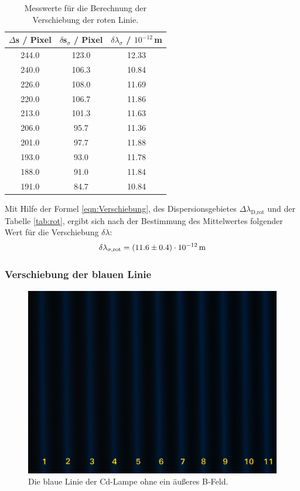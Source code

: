 \begin{table}[H]
  \centering
  \caption{Messwerte für die Berechnung der Verschiebung der roten Linie.}
  \label{tab:rot}
  \begin{tabular}{c c c}
    $\Delta$s / Pixel & $\delta$s$_{\sigma}$ / Pixel & $\delta \lambda_{\sigma}$ / $10^{-12}$\,m \\
    \hline
    244.0 & 123.0 & 12.33 \\
    240.0 & 106.3 & 10.84 \\
    226.0 & 108.0 & 11.69 \\
    220.0 & 106.7 & 11.86 \\
    213.0 & 101.3 & 11.63 \\
    206.0 & 95.7  & 11.36 \\
    201.0 & 97.7  & 11.88 \\
    193.0 & 93.0  & 11.78 \\
    188.0 & 91.0  & 11.84 \\
    191.0 & 84.7  & 10.84 \\
    \hline
  \end{tabular}
\end{table}

Mit Hilfe der Formel \eqref{eqn:Verschiebung}, des Dispersionsgebietes $\Delta\lambda_\text{D,rot}$ und der Tabelle \eqref{tab:rot}, ergibt sich nach der Bestimmung des Mittelwertes folgender Wert für die Verschiebung $\delta\lambda$:
\begin{align*}
  \delta \lambda_{\sigma,\text{rot}} = (\num{11.6 +- 0.4})\cdot 10^{-12}\,\text{m} \\
\end{align*}



\subsubsection{Verschiebung der blauen Linie}
\begin{figure}[H]
  \centering
  \includegraphics[width=0.8\linewidth]{Bilder/BoB.JPG}
  \caption{Die blaue Linie der Cd-Lampe ohne ein äußeres B-Feld.}
  \label{fig:BoB}
\end{figure}

